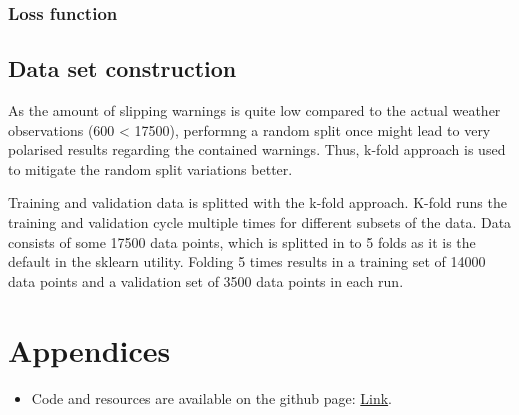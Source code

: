 \documentclass[12pt, a4paper]{report}
\begin{document}
    \subsubsection{Loss function}
    \subsection{Data set construction}
    As the amount of slipping warnings is quite low compared to the actual weather observations (600 < 17500), performng a random split once might lead to 
    very polarised results regarding the contained warnings. Thus, k-fold approach is used to mitigate the random split variations better.

    Training and validation data is splitted with the k-fold approach. K-fold runs the training and validation cycle multiple times for different
    subsets of the data. Data consists of some 17500 data points, which is splitted in to 5 folds as it is the default in the sklearn utility. 
    Folding 5 times results in a training set of 14000 data points and a validation set of 3500 data points in each run.



    \newpage

    \section{Appendices}
    \begin{itemize}
      \item Code and resources are available on the github page: \href{}{Link}.
    \end{itemize}
\end{document}

